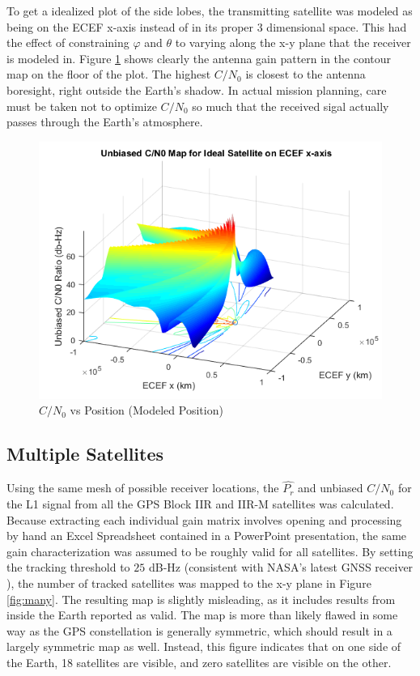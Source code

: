 \documentclass[11pt]{article}
\newcommand{\cnr}{C/N_0}
\begin{document}
To get a idealized plot of the side lobes, the transmitting satellite was modeled as being on the ECEF x-axis instead of in its proper 3 dimensional space. This had the effect of constraining $\varphi$ and $\theta$ to varying along the x-y plane that the receiver is modeled in. Figure \ref{fig:cn0xaxis} shows clearly the antenna gain pattern in the contour map on the floor of the plot. The highest $\cnr$ is closest to the antenna boresight, right outside the Earth's shadow. In actual mission planning, care must be taken not to optimize $\cnr$ so much that the received sigal actually passes through the Earth's atmosphere.

\begin{figure}[h]
\centering
\includegraphics[width=.75\textwidth]{../Images/cn0mapxaxis.png}
\caption{$\cnr$ vs Position (Modeled Position)}
\label{fig:cn0xaxis}
\end{figure}

\FloatBarrier
\subsection{Multiple Satellites}
Using the same mesh of possible receiver locations, the $\hat{P_r}$ and unbiased $\cnr$ for the L1 signal from all the GPS Block IIR and IIR-M satellites was calculated. Because extracting each individual gain matrix involves opening and processing by hand an Excel Spreadsheet contained in a PowerPoint presentation, the same gain characterization was assumed to be roughly valid for all satellites. By setting the tracking threshold to $25$ dB-Hz (consistent with NASA's latest GNSS receiver \cite{ssv}), the number of tracked satellites was mapped to the x-y plane in Figure \ref{fig:many}. The resulting map is slightly misleading, as it includes results from inside the Earth reported as valid. The map is more than likely flawed in some way as the GPS constellation is generally symmetric, which should result in a largely symmetric map as well. Instead, this figure indicates that on one side of the Earth, 18 satellites are visible, and zero satellites are visible on the other.
\end{document}
